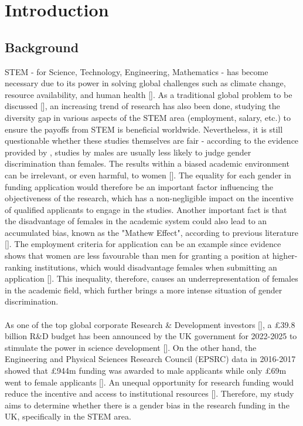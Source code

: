 \section{Introduction}
\subsection{Background}

\noindent STEM - for Science, Technology, Engineering, Mathematics - has become necessary due to its power in solving global challenges such as climate change, resource availability, and human health [\cite{Flavia}]. As a traditional global problem to be discussed [\cite{garcia2019bridging}], an increasing trend of research has also been done, studying the diversity gap in various aspects of the STEM area (employment, salary, etc.) to ensure the payoffs from STEM is beneficial worldwide. Nevertheless, it is still questionable whether these studies themselves are fair - according to the evidence provided by \cite{handley2015quality}, studies by males are usually less likely to judge gender discrimination than females. The results within a biased academic environment can be irrelevant, or even harmful, to women [\cite{cislak2018bias}]. The equality for each gender in funding application would therefore be an important factor influencing the objectiveness of the research, which has a non-negligible impact on the incentive of qualified applicants to engage in the studies. Another important fact is that the disadvantage of females in the academic system could also lead to an accumulated bias, known as the "Mathew Effect", according to previous literature [\cite{jebsen2020review}]. The employment criteria for application can be an example since evidence shows that women are less favourable than men for granting a position at higher-ranking institutions, which would disadvantage females when submitting an application [\cite{cruz2022gender}]. This inequality, therefore, causes an underrepresentation of females in the academic field, which further brings a more intense situation of gender discrimination.\\
\\
As one of the top global corporate Research \& Development investors [\cite{GII2022}], a £39.8 billion R\&D budget has been announced by the UK government for 2022-2025 to stimulate the power in science development [\cite{funding2025}]. On the other hand, the Engineering and Physical Sciences Research Council (EPSRC) data in 2016-2017 showed that £944m funding was awarded to male applicants while only £69m went to female applicants [\cite{jebsen2020review}]. An unequal opportunity for research funding would reduce the incentive and access to institutional resources [\cite{cruz2022gender}]. Therefore, my study aims to determine whether there is a gender bias in the research funding in the UK, specifically in the STEM area.

